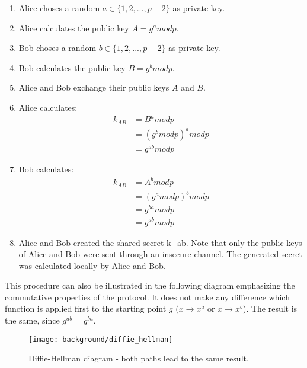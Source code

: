 \begin{enumerate}
\item Alice choses a random $a \in \{1, 2, ... , p-2\}$ as private key. 
\item Alice calculates the public key $A = g^a mod p$.
\item Bob choses a random $b \in \{1, 2, ... , p-2\}$ as private key. 
\item Bob calculates the public key $B = g^b mod p$.
\item Alice and Bob exchange their public keys $A$ and $B$.
\item Alice calculates: 
\begin{equation}
\begin{split}
k_{AB} & = B^a mod p \\
 & = (g^b mod p)^a mod p \\
 & = g^{a b} mod p
\end{split}
\end{equation}
\item Bob calculates: 
\begin{equation}
\begin{split}
k_{AB} & = A^b mod p \\
 & = (g^a mod p)^b mod p \\
 & = g^{b a} mod p \\
 & = g^{a b} mod p
\end{split}
\end{equation}
\item Alice and Bob created the shared secret \gls{k_ab}. Note that only the public keys of Alice and Bob were sent through an insecure channel. The generated secret was calculated locally by Alice and Bob.
\end{enumerate}
This procedure can also be illustrated in the following diagram emphasizing the commutative properties of the protocol. It does not make any difference which function is applied first to the starting point $g$ ($x \to x^a$ or $x \to x^b$). The result is the same, since $g^{ab} = g^{ba}$.

\begin{figure}[htpb]
  \centering
  \texttt{[image: background/diffie\_hellman]}
  \caption[Diffie-Hellman diagram]{Diffie-Hellman diagram - both paths lead to the same result.}
  \label{fig:diffie_hellman}
\end{figure}

